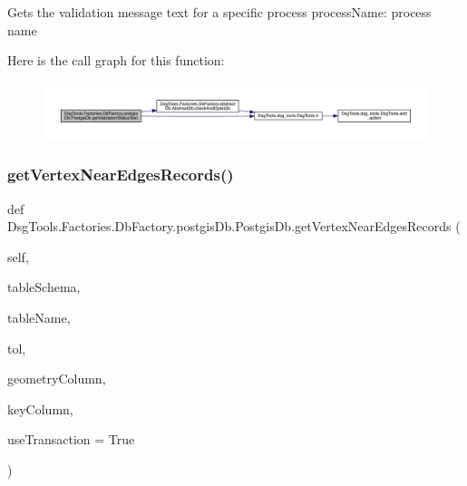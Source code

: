 \begin{DoxyVerb}Gets the validation message text for a specific process
processName: process name
\end{DoxyVerb}
 Here is the call graph for this function\+:
\nopagebreak
\begin{figure}[H]
\begin{center}
\leavevmode
\includegraphics[width=350pt]{class_dsg_tools_1_1_factories_1_1_db_factory_1_1postgis_db_1_1_postgis_db_a82dcb02ab6375562fa7b576df97ef964_cgraph}
\end{center}
\end{figure}
\mbox{\label{class_dsg_tools_1_1_factories_1_1_db_factory_1_1postgis_db_1_1_postgis_db_a3dd2b256b38a8a296ba5df4ab7f60395}} 
\subsubsection{\texorpdfstring{get\+Vertex\+Near\+Edges\+Records()}{getVertexNearEdgesRecords()}}
{\footnotesize\ttfamily def Dsg\+Tools.\+Factories.\+Db\+Factory.\+postgis\+Db.\+Postgis\+Db.\+get\+Vertex\+Near\+Edges\+Records (\begin{DoxyParamCaption}\item[{}]{self,  }\item[{}]{table\+Schema,  }\item[{}]{table\+Name,  }\item[{}]{tol,  }\item[{}]{geometry\+Column,  }\item[{}]{key\+Column,  }\item[{}]{use\+Transaction = {\ttfamily True} }\end{DoxyParamCaption})}

